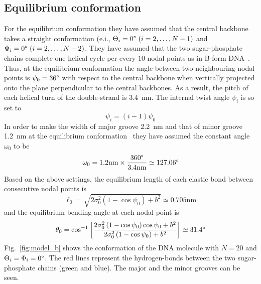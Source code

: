 \documentclass[a4paper,10pt]{article}
\begin{document}
\subsection{Equilibrium conformation}
For the equilibrium conformation they have assumed that the central backbone takes a straight conformation (e.i., $\Theta_i=0\degree\ (i=2,\dots,N-1)$ and $\Phi_i=0\degree\ (i=2,\dots,N-2)$.
They have assumed that the two sugar-phosphate chains complete one helical cycle per every $10$ nodal points as in B-form DNA~\cite{1, 2}.
Thus, at the equilibrium conformation the angle between two neighbouring nodal points is $\psi_0=36\degree$ with respect to the central backbone when vertically projected onto the plane perpendicular to the central backbones.
As a result, the pitch of each helical turn of the double-strand is \SI{3.4}{\nm}.
The internal twist angle $\psi_i$ is so set to
\begin{equation}
\psi_i=\left(i-1\right) \psi_0
\end{equation}
In order to make the width of major groove \SI{2.2}{\nm} and that of minor groove \SI{1.2}{\nm} at the equilibrium conformation~\cite{1, 2} they have assumed the constant angle $\omega_0$ to be
\begin{equation}
\omega_0=1.2\text{nm}\times\dfrac{360\degree}{3.4\text{nm}}\simeq127.06\degree
\end{equation}
Based on the above settings, the equilibrium length of each elastic bond between consecutive nodal points is
\begin{equation}\label{eq:l_0}
\ell_0=\sqrt{2\sigma_0^2\left(1-\cos\psi_0\right)+b^2}\simeq0.705\text{nm}
\end{equation}
and the equilibrium bending angle at each nodal point is
\begin{equation}\label{eq:theta_0}
\theta_0=\cos^{-1}\left[\dfrac{2\sigma_0^2\left(1-\cos\psi_0\right)\cos\psi_0+b^2}{2\sigma_0^2\left(1-\cos\psi_0\right)+b^2}\right]\simeq31.4\degree
\end{equation}
Fig.~\ref{fig:model_b} shows the conformation of the DNA molecule with $N=20$ and $\Theta_{i}=\Phi_{i}=0\degree$.
The red lines represent the hydrogen-bonds between the two sugar-phosphate chains (green and blue).
The major and the minor grooves can be seen.
\end{document}
